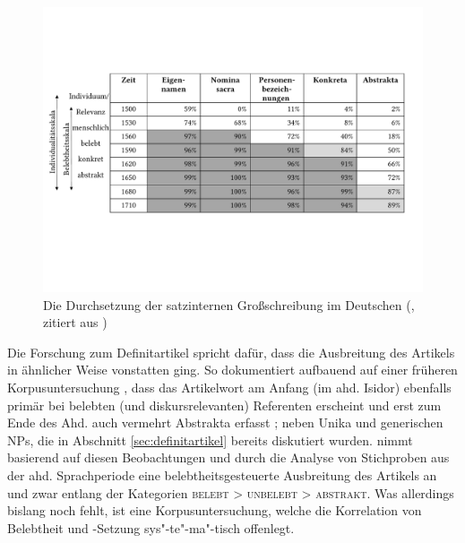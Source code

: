 \begin{figure}
\includegraphics[width=\textwidth]{images/Substantivgrossschreibung.pdf}
\caption {Die Durchsetzung der satzinternen Großschreibung im Deutschen (\citealt{Bergmann1999}, zitiert aus \citealt[351]{Szczepaniak2011})\label{sgs}}
\end{figure} 

Die Forschung zum Definitartikel spricht dafür, dass die Ausbreitung des Artikels in ähnlicher Weise vonstatten ging. So dokumentiert \textcite[]{Oubouzar1992} aufbauend auf einer früheren Korpusuntersuchung \parencite{Oubouzar1989}, dass das  Artikelwort  am Anfang (im ahd. Isidor) ebenfalls primär bei belebten (und diskursrelevanten) Referenten erscheint \parencite[vgl. insbesondere][566--567]{Oubouzar1989} und erst zum Ende des Ahd. auch vermehrt Abstrakta erfasst \parencite[][572]{Oubouzar1989}; neben Unika und generischen NPs, die in Abschnitt \ref{sec:definitartikel} bereits diskutiert wurden. \textcite[73--78]{Szczepaniak2011} nimmt basierend auf diesen Beobachtungen und durch die Analyse von Stichproben aus der ahd. Sprachperiode eine belebtheitsgesteuerte Ausbreitung des Artikels an und zwar entlang der Kategorien \textsc{belebt > unbelebt > abstrakt}. Was allerdings bislang noch fehlt, ist eine Korpusuntersuchung, welche die Korrelation von Belebtheit und -Setzung sys"-te"-ma"-tisch offenlegt. 


